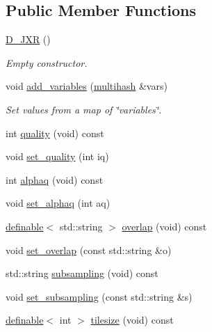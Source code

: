 \subsection*{Public Member Functions}
\begin{DoxyCompactItemize}
\item 
\hyperlink{class_photo_finish_1_1_d___j_x_r_a7fe3f2922a9f6127d8d217b9cdb7cb45}{D\+\_\+\+J\+XR} ()
\begin{DoxyCompactList}\small\item\em Empty constructor. \end{DoxyCompactList}\item 
void \hyperlink{class_photo_finish_1_1_d___j_x_r_a129b83b661aa0af9e859805d5068ee8b}{add\+\_\+variables} (\hyperlink{namespace_photo_finish_a6f41796f162687538b7da5c7a95e2d18}{multihash} \&vars)
\begin{DoxyCompactList}\small\item\em Set values from a map of \char`\"{}variables\char`\"{}. \end{DoxyCompactList}\item 
int \hyperlink{class_photo_finish_1_1_d___j_x_r_aa830c448b69529f9d823e4f0e12d7b01}{quality} (void) const
\item 
void \hyperlink{class_photo_finish_1_1_d___j_x_r_a11551a118c454387d5fbce0d09985065}{set\+\_\+quality} (int iq)
\item 
int \hyperlink{class_photo_finish_1_1_d___j_x_r_a97e0436d0755f5450c500ad480440972}{alphaq} (void) const
\item 
void \hyperlink{class_photo_finish_1_1_d___j_x_r_a7a9052aa97529e49e790d482edf90168}{set\+\_\+alphaq} (int aq)
\item 
\hyperlink{class_photo_finish_1_1definable}{definable}$<$ std\+::string $>$ \hyperlink{class_photo_finish_1_1_d___j_x_r_ac0f2bc07bf26e54fb3504982631a3cfb}{overlap} (void) const
\item 
void \hyperlink{class_photo_finish_1_1_d___j_x_r_a9a0493c9fc35b9a9804e7aa268979a1e}{set\+\_\+overlap} (const std\+::string \&o)
\item 
std\+::string \hyperlink{class_photo_finish_1_1_d___j_x_r_adf4af0a944182a8463fb33223af7afd9}{subsampling} (void) const
\item 
void \hyperlink{class_photo_finish_1_1_d___j_x_r_af48c6364eef8d653066d9099566e167d}{set\+\_\+subsampling} (const std\+::string \&s)
\item 
\hyperlink{class_photo_finish_1_1definable}{definable}$<$ int $>$ \hyperlink{class_photo_finish_1_1_d___j_x_r_aecdfe572709edc117ab1a43d4973c3fb}{tilesize} (void) const

\end{DoxyCompactItemize}
